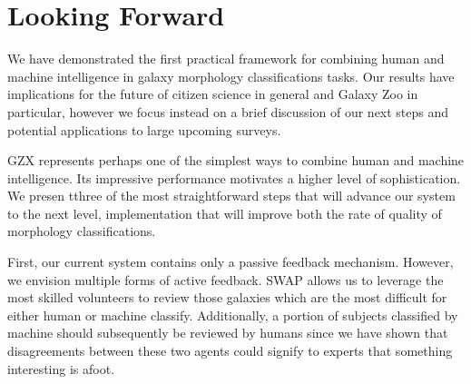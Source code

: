 \documentclass[twocolumn]{aastex6}
\newcommand{\feat}{`Featured'}
\newcommand{\notfeat}{`Not'}
\begin{document}
\section{Looking Forward}\label{sec: visions}

We have demonstrated the first practical framework for combining human and machine
 intelligence in galaxy morphology classifications tasks. 
Our results have implications for the future of citizen science in general and 
Galaxy Zoo in particular, however we focus instead on a brief discussion of our next 
steps and potential applications to large upcoming surveys. 

GZX represents perhaps one of the simplest ways to combine human
and machine intelligence. Its impressive performance motivates a higher 
level of sophistication. We presen tthree of the most 
straightforward steps that will advance our system to the next level, implementation
that will improve both the rate of quality of morphology classifications. 

First, our current system contains only a passive feedback mechanism. However,  
we envision multiple forms of active feedback.  SWAP allows us to leverage the 
most skilled volunteers to review those galaxies which are the most difficult for either
 human or machine classify. Additionally, a portion of subjects classified by machine 
should subsequently be reviewed by humans since we have shown that disagreements 
between these two agents could signify to experts that something interesting is afoot. 
\end{document}
